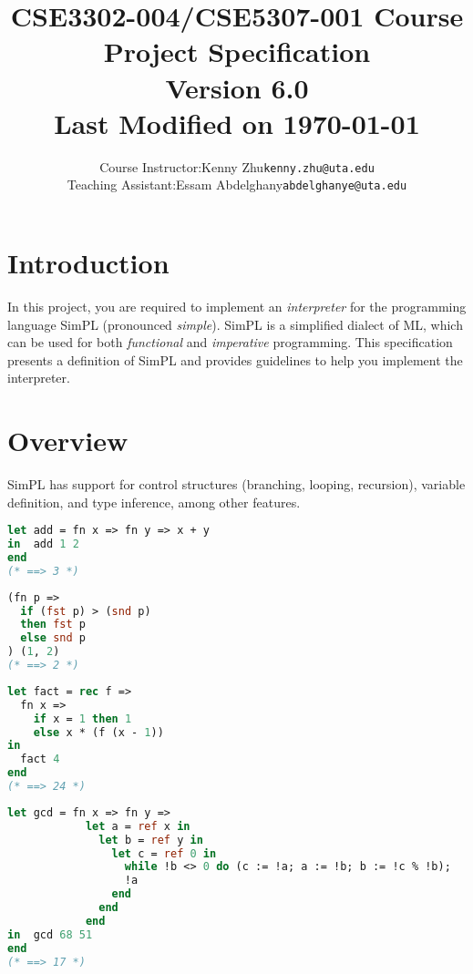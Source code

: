 \documentclass{article}
\title{
  \textbf{CSE3302-004/CSE5307-001 Course Project Specification} \\
  \textbf{\normalsize Version 6.0} \\
  {\normalsize Last Modified on \today}}
\author{
  \normalsize
  \begin{tabular}{rcl}
    Course Instructor: & Kenny Zhu & \texttt{kenny.zhu@uta.edu} \\
    Teaching Assistant: & Essam Abdelghany & \texttt{abdelghanye@uta.edu} \\
  \end{tabular}}
\date{}
\begin{document}
\maketitle

\tableofcontents

\newpage

\section{Introduction}

In this project, you are required to implement an \emph{interpreter} for the
programming language SimPL (pronounced \emph{simple}).  SimPL is a simplified
dialect of ML, which can be used for both \emph{functional} and
\emph{imperative} programming.  This specification presents a definition of
SimPL and provides guidelines to help you implement the interpreter.

\section{Overview}
SimPL has support for control structures (branching, looping, recursion), variable definition, and type inference, among other features.

\begin{lstlisting}[language=ML]
let add = fn x => fn y => x + y
in  add 1 2
end
(* ==> 3 *)
\end{lstlisting}

\begin{lstlisting}[language=ML]
(fn p =>
  if (fst p) > (snd p)
  then fst p
  else snd p
) (1, 2)
(* ==> 2 *)
\end{lstlisting}


\begin{lstlisting}[language=ML]
let fact = rec f =>
  fn x =>
    if x = 1 then 1
    else x * (f (x - 1))
in
  fact 4
end
(* ==> 24 *)
\end{lstlisting}



\begin{lstlisting}[language=ML]
let gcd = fn x => fn y =>
            let a = ref x in
              let b = ref y in
                let c = ref 0 in
                  while !b <> 0 do (c := !a; a := !b; b := !c % !b);
                  !a
                end
              end
            end
in  gcd 68 51
end
(* ==> 17 *)
\end{lstlisting}


\newpage
\end{document}
